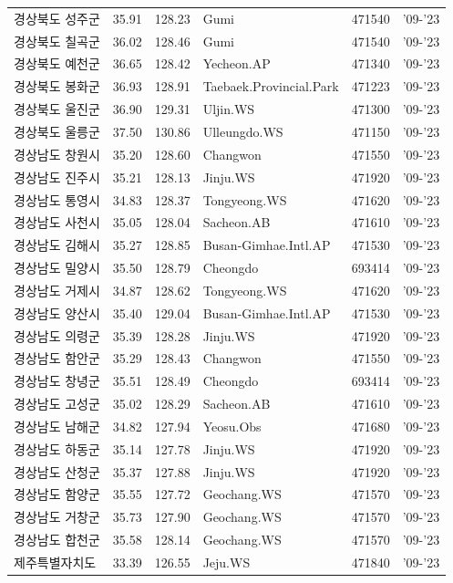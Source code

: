 \begin{longtable}{lcclcc}
  경상북도 성주군 & 35.91 & 128.23 & Gumi & 471540 & '09-'23 \\
  경상북도 칠곡군 & 36.02 & 128.46 & Gumi & 471540 & '09-'23 \\
  경상북도 예천군 & 36.65 & 128.42 & Yecheon.AP & 471340 & '09-'23 \\
  경상북도 봉화군 & 36.93 & 128.91 & Taebaek.Provincial.Park & 471223 & '09-'23 \\
  경상북도 울진군 & 36.90 & 129.31 & Uljin.WS & 471300 & '09-'23 \\
  경상북도 울릉군 & 37.50 & 130.86 & Ulleungdo.WS & 471150 & '09-'23 \\
  경상남도 창원시 & 35.20 & 128.60 & Changwon & 471550 & '09-'23 \\
  경상남도 진주시 & 35.21 & 128.13 & Jinju.WS & 471920 & '09-'23 \\
  경상남도 통영시 & 34.83 & 128.37 & Tongyeong.WS & 471620 & '09-'23 \\
  경상남도 사천시 & 35.05 & 128.04 & Sacheon.AB & 471610 & '09-'23 \\
  경상남도 김해시 & 35.27 & 128.85 & Busan-Gimhae.Intl.AP & 471530 & '09-'23 \\
  경상남도 밀양시 & 35.50 & 128.79 & Cheongdo & 693414 & '09-'23 \\
  경상남도 거제시 & 34.87 & 128.62 & Tongyeong.WS & 471620 & '09-'23 \\
  경상남도 양산시 & 35.40 & 129.04 & Busan-Gimhae.Intl.AP & 471530 & '09-'23 \\
  경상남도 의령군 & 35.39 & 128.28 & Jinju.WS & 471920 & '09-'23 \\
  경상남도 함안군 & 35.29 & 128.43 & Changwon & 471550 & '09-'23 \\
  경상남도 창녕군 & 35.51 & 128.49 & Cheongdo & 693414 & '09-'23 \\
  경상남도 고성군 & 35.02 & 128.29 & Sacheon.AB & 471610 & '09-'23 \\
  경상남도 남해군 & 34.82 & 127.94 & Yeosu.Obs & 471680 & '09-'23 \\
  경상남도 하동군 & 35.14 & 127.78 & Jinju.WS & 471920 & '09-'23 \\
  경상남도 산청군 & 35.37 & 127.88 & Jinju.WS & 471920 & '09-'23 \\
  경상남도 함양군 & 35.55 & 127.72 & Geochang.WS & 471570 & '09-'23 \\
  경상남도 거창군 & 35.73 & 127.90 & Geochang.WS & 471570 & '09-'23 \\
  경상남도 합천군 & 35.58 & 128.14 & Geochang.WS & 471570 & '09-'23 \\
  제주특별자치도 & 33.39 & 126.55 & Jeju.WS & 471840 & '09-'23 \\
\end{longtable}



